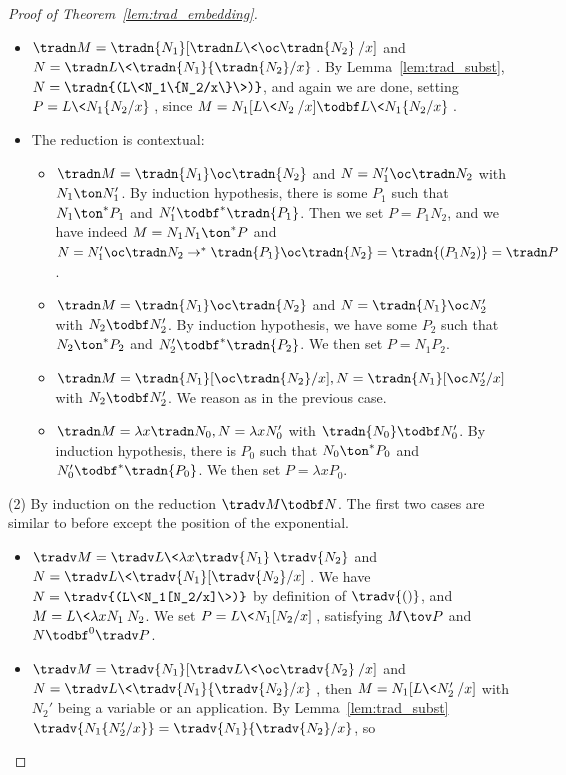 \begin{proof}[Proof of Theorem~\ref{lem:trad_embedding}]
\begin{itemize}
		\item $\tradn M=\tradn{N_1}[\tradn L\<\oc \tradn{N_2}\>/x]$ and
			$N=\tradn L\<\tradn{N_1}\{\tradn{N_2}/x\}\>$. By
			Lemma~\ref{lem:trad_subst},
			$N=\tradn{(L\<N_1\{N_2/x\}\>)}$, and again we are done,
			setting $P=L\<N_1\{N_2/x\}\>$, since $M=N_1[L\< N_2\>/x]\todbf L\<N_1\{N_2/x\}\>$.
		\item The reduction is contextual:
			\begin{itemize}
				\item $\tradn M=\tradn{N_1}\oc\tradn{N_2}$ and
					$N=N_1'\oc\tradn N_2$ with $N_1\ton
					N_1'$. By induction hypothesis, there is
					some $P_1$ such that $N_1\ton^* P_1$ and
					$N_1'\todbf^* \tradn{P_1}$. Then we set
					$P=P_1N_2$, and we have indeed
					$M=N_1N_1\ton^*P$ and $N=N_1'\oc\tradn
					N_2\to^*
					\tradn{P_1}\oc\tradn{N_2}=\tradn{(P_1N_2)}=\tradn P$.
				\item $\tradn M=\tradn{N_1}\oc\tradn{N_2}$ and
					$N=\tradn{N_1}\oc N_2'$ with $N_2\todbf
					N_2'$. By induction hypothesis, we have
					some $P_2$ such that $N_2\ton^*P_2$ and
					$N_2'\todbf^*\tradn{P_2}$. We then set
					$P=N_1P_2$.
				\item $\tradn
					M=\tradn{N_1}[\oc\tradn{N_2}/x],N=\tradn{N_1}[\oc
					N_2'/x]$ with $N_2\todbf N_2'$. We reason
					as in the previous case.
				\item $\tradn M=\lambda x\tradn N_0, N=\lambda x
					N_0'$ with $\tradn{N_0}\todbf N_0'$. By induction
					hypothesis, there is $P_0$ such that
					$N_0\ton^* P_0$ and $N_0'\todbf^*
					\tradn{P_0}$. We then set $P=\lambda x
					P_0$.
			\end{itemize}
	\end{itemize}
	(2) By induction on the reduction $\tradv M\todbf N$. The first two
	cases are similar to before except the position of the exponential.
	\begin{itemize}
		\item $\tradv M=\tradv L\<\lambda x \tradv{N_1}\>\tradv{N_2}$ and
			$N=\tradv L\<\tradv{N_1}[\tradv{N_2}/x]\>$. We have
			$N=\tradv{(L\<N_1[N_2/x]\>)}$ by definition of
			$\tradv{()}$, and $M=L\<\lambda xN_1\>N_2$. We set
			$P=L\<N_1[N_2/x]\>$, satisfying $M\tov P$ and $N\todbf^0
			\tradv P$.
		\item $\tradv M=\tradv{N_1}[\tradv L\<\oc \tradv{N_2}\>/x]$ and
			$N=\tradv L\<\tradv{N_1}\{\tradv{N_2}/x\}\>$, then
			$M=N_1[L\<N_2'\>/x]$ with $N_2'$ being a
			variable or an application. By
			Lemma~\ref{lem:trad_subst}
			$\tradv{N_1\{N_2'/x\}}=\tradv{N_1}\{\tradv{N_2}/x\}$, so

\end{itemize}
\end{proof}
